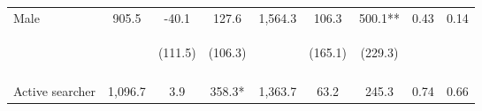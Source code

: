 \begin{tabular}{lcccccccc}
\noalign{\smallskip}Male & 905.5 & -40.1 & 127.6 & 1,564.3 & 106.3 & 500.1** & 0.43 & 0.14\\
 & \begin{footnotesize}\end{footnotesize} & \begin{footnotesize}(111.5)\end{footnotesize} & \begin{footnotesize}(106.3)\end{footnotesize} & \begin{footnotesize}\end{footnotesize} & \begin{footnotesize}(165.1)\end{footnotesize} & \begin{footnotesize}(229.3)\end{footnotesize} & \begin{footnotesize}\end{footnotesize} & \begin{footnotesize}\end{footnotesize}\\
 & \begin{footnotesize}\end{footnotesize} & \begin{footnotesize}[1.000]\end{footnotesize} & \begin{footnotesize}[0.090]\end{footnotesize} & \begin{footnotesize}\end{footnotesize} & \begin{footnotesize}[1.000]\end{footnotesize} & \begin{footnotesize}[0.160]\end{footnotesize} & \begin{footnotesize}\end{footnotesize} & \begin{footnotesize}\end{footnotesize}\\
\noalign{\smallskip}Active searcher & 1,096.7 & 3.9 & 358.3* & 1,363.7 & 63.2 & 245.3 & 0.74 & 0.66\\

\end{tabular}
